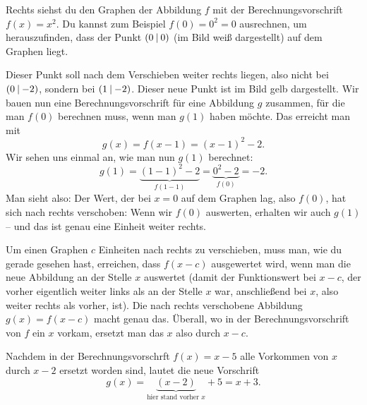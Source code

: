 \documentclass[../../main.tex]{subfiles}
\begin{document}
\begin{example}{}

    Rechts siehst du den Graphen der Abbildung $f$ mit der Berechnungsvorschrift $f(x)=x^2$. Du kannst zum Beispiel $f(0)=0^2=0$ ausrechnen, um herauszufinden, dass der Punkt $\left(0 \:\middle|\: 0\right)$ (im Bild weiß dargestellt) auf dem Graphen liegt.
    
    Dieser Punkt soll nach dem Verschieben weiter rechts liegen, also nicht bei $\left(0 \:\middle|\: -2\right)$, sondern bei $\left(1 \:\middle|\: -2\right)$. Dieser neue Punkt ist im Bild gelb dargestellt. Wir bauen nun eine Berechnungsvorschrift für eine Abbildung $g$ zusammen, für die man $f(0)$ berechnen muss, wenn man $g(1)$ haben möchte. Das erreicht man mit \[g(x)=f(x-1)=(x-1)^2-2.\]
    Wir sehen uns einmal an, wie man nun $g(1)$ berechnet: \[g(1)=\underbrace{(1-1)^2-2}_{f(1-1)}=\underbrace{0^2-2}_{f(0)}=-2.\]
    Man sieht also: Der Wert, der bei $x=0$ auf dem Graphen lag, also $f(0)$, hat sich nach rechts verschoben: Wenn wir $f(0)$ auswerten, erhalten wir auch $g(1)$ -- und das ist genau eine Einheit weiter rechts.
\end{example}

Um einen Graphen $c$ Einheiten nach rechts zu verschieben, muss man, wie du gerade gesehen hast, erreichen, dass $f(x-c)$ ausgewertet wird, wenn man die neue Abbildung an der Stelle $x$ auswertet (damit der Funktionswert bei $x-c$, der vorher eigentlich weiter links als an der Stelle $x$ war, anschließend bei $x$, also weiter rechts als vorher, ist). Die nach rechts verschobene Abbildung $g(x)=f(x-c)$ macht genau das. Überall, wo in der Berechnungsvorschrift von $f$ ein $x$ vorkam, ersetzt man das $x$ also durch $x-c$.

\begin{example}{}
    Nachdem in der Berechnungsvorschrft $f(x)=x-5$ alle Vorkommen von $x$ durch $x-2$ ersetzt worden sind, lautet die neue Vorschrift 
    \[g(x)=\underbrace{(x-2)}_{\text{hier stand vorher }x}+5=x+3.\]
\end{example}
\end{document}
